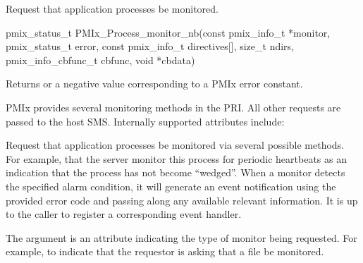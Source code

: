 \summary

Request that application processes be monitored.

\format

\cspecificstart
\begin{codepar}
pmix_status_t
PMIx_Process_monitor_nb(const pmix_info_t *monitor, pmix_status_t error,
                        const pmix_info_t directives[], size_t ndirs,
                        pmix_info_cbfunc_t cbfunc, void *cbdata)
\end{codepar}
\cspecificend

\begin{arglist}
\end{arglist}

Returns  or a negative value corresponding to a PMIx error constant.

\priattr
\ac{PMIx} provides several monitoring methods in the \ac{PRI}. All other requests are passed to the host \ac{SMS}. Internally supported attributes include:



\descr

Request that application processes be monitored via several possible methods.
For example, that the server monitor this process for periodic heartbeats as an indication that the process has not become ``wedged''.
When a monitor detects the specified alarm condition, it will generate an event notification using the provided error code and passing along any available relevant information.
It is up to the caller to register a corresponding event handler.

The  argument is an attribute indicating the type of monitor being requested.
For example,  to indicate that the requestor is asking that a file be monitored.

